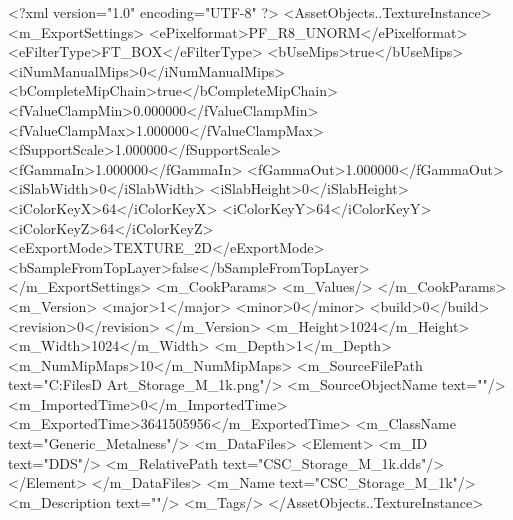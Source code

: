 <?xml version="1.0" encoding="UTF-8" ?>
<AssetObjects..TextureInstance>
	<m_ExportSettings>
		<ePixelformat>PF_R8_UNORM</ePixelformat>
		<eFilterType>FT_BOX</eFilterType>
		<bUseMips>true</bUseMips>
		<iNumManualMips>0</iNumManualMips>
		<bCompleteMipChain>true</bCompleteMipChain>
		<fValueClampMin>0.000000</fValueClampMin>
		<fValueClampMax>1.000000</fValueClampMax>
		<fSupportScale>1.000000</fSupportScale>
		<fGammaIn>1.000000</fGammaIn>
		<fGammaOut>1.000000</fGammaOut>
		<iSlabWidth>0</iSlabWidth>
		<iSlabHeight>0</iSlabHeight>
		<iColorKeyX>64</iColorKeyX>
		<iColorKeyY>64</iColorKeyY>
		<iColorKeyZ>64</iColorKeyZ>
		<eExportMode>TEXTURE_2D</eExportMode>
		<bSampleFromTopLayer>false</bSampleFromTopLayer>
	</m_ExportSettings>
	<m_CookParams>
		<m_Values/>
	</m_CookParams>
	<m_Version>
		<major>1</major>
		<minor>0</minor>
		<build>0</build>
		<revision>0</revision>
	</m_Version>
	<m_Height>1024</m_Height>
	<m_Width>1024</m_Width>
	<m_Depth>1</m_Depth>
	<m_NumMipMaps>10</m_NumMipMaps>
	<m_SourceFilePath text="C:\Users\Shadow\Desktop\Working Files\3D Art\Textures\CSC_Storage_M_1k.png"/>
	<m_SourceObjectName text=""/>
	<m_ImportedTime>0</m_ImportedTime>
	<m_ExportedTime>3641505956</m_ExportedTime>
	<m_ClassName text="Generic_Metalness"/>
	<m_DataFiles>
		<Element>
			<m_ID text="DDS"/>
			<m_RelativePath text="CSC_Storage_M_1k.dds"/>
		</Element>
	</m_DataFiles>
	<m_Name text="CSC_Storage_M_1k"/>
	<m_Description text=""/>
	<m_Tags/>
</AssetObjects..TextureInstance>

